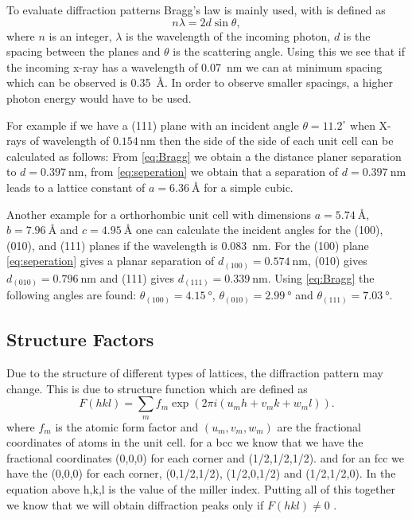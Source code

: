 To evaluate diffraction patterns Bragg's law is mainly used, with is defined as
\begin{equation}
    n\lambda=2d\sin \theta,
    \label{eq:Bragg}
\end{equation}
where $n$ is an integer, $\lambda$ is the wavelength of the incoming photon, $d$ is the spacing between the planes and $\theta$ is the scattering angle. Using this we see that if the incoming x-ray has a wavelength of \SI{0.07}{\nano\m} we can at minimum spacing which can be observed is \SI{0.35}{\angstrom}. In order to observe smaller spacings, a higher photon energy would have to be used. 

For example if we have a (111) plane with an  incident angle \( \theta = 11.2^\circ \) when X-rays of wavelength of \( 0.154 \, \text{nm} \) then the side of the side of each unit cell can be calculated as follows: From \autoref{eq:Bragg} we obtain a the distance planer separation to $d=\SI{0.397}{\nano\m}$, from \autoref{eq:seperation} we obtain that a separation of $d=\SI{0.397}{\nano\m}$ leads to a lattice constant of $a=\SI{6.36}{\angstrom}$ for a simple cubic. 

Another example for a orthorhombic unit cell with dimensions $a=\SI{5.74}{\angstrom}$, $b=\SI{7.96}{\angstrom}$ and $c=\SI{4.95}{\angstrom}$ one can calculate the incident angles for the (100), (010), and
(111) planes if the  wavelength is \SI{0.083}{\nano\m}. For the (100) plane \autoref{eq:seperation} gives a planar separation of $d_{(100)}=\SI{0.574}{\nano\m}$, (010) gives $d_{(010)}=\SI{0.796}{\nano\m}$ and (111) gives $d_{(111)}=\SI{0.339}{\nano\m}$. Using \autoref{eq:Bragg} the following angles are found: $\theta_{(100)} = \SI{4.15}{\degree}$, $\theta_{(010)} = \SI{2.99}{\degree}$ and $\theta_{(111)} = \SI{7.03}{\degree}$.

\subsection{Structure Factors}
Due to the structure of different types of lattices, the diffraction pattern may change. This is due to structure function which are defined as 
\begin{equation}
    F(hkl) = \sum_{m} f_m \exp\left( 2\pi i (u_m h + v_m k + w_m l) \right). 
    \label{eq:structurefunction}
\end{equation}
where $f_m$ is the atomic form factor and $(u_m,v_m,w_m)$ are the fractional coordinates of atoms in the unit cell. for a bcc we know that we have the fractional coordinates (0,0,0) for each corner and (1/2,1/2,1/2). and for an fcc we have the (0,0,0) for each corner,  (0,1/2,1/2), (1/2,0,1/2) and (1/2,1/2,0). In the equation above h,k,l is the value of the miller index. Putting all of this together we know that we will obtain diffraction peaks only if $F(hkl)\neq0$ \cite{solidstatephysics2025}. 

